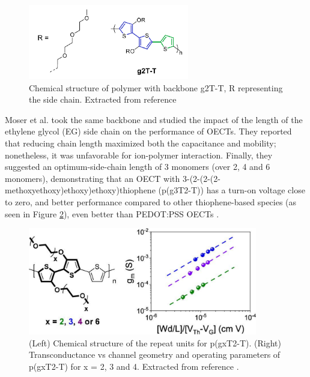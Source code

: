 \begin{figure}[h]
	\centering
	\includegraphics[width=7cm]{Images/pdf/g2T-T.pdf}
	\caption[Chemical structure of polymer g2T-T]{Chemical structure of polymer with backbone g2T-T, R representing the side chain. Extracted from reference \cite{nielsenMolecularDesignSemiconducting2016}}
	\label{fig:g2TT}
\end{figure}

Moser et al. took the same backbone and studied the impact of the length of the ethylene glycol (EG) side chain on the performance of OECTs. They reported that reducing chain length maximized both the capacitance and mobility; nonetheless, it was unfavorable for ion-polymer interaction. Finally, they suggested an optimum-side-chain length of 3 monomers (over 2, 4 and 6 monomers), demonstrating that an OECT with 3-(2-(2-(2-methoxyethoxy)ethoxy)ethoxy)thiophene (p(g3T2-T)) has a turn-on voltage close to zero, and better performance compared to other thiophene-based species (as seen in Figure \ref{fig:pg3t}), even better than PEDOT:PSS OECTs %
\cite{moserEthyleneGlycolBasedSide2020}.

\begin{figure}[h]
	\centering
	\includegraphics[width=10cm]{Images/pdf/pg3t+perf.pdf}
	\caption[Chemical structure and transconductance of g2T-T with side-chain engineering]{(Left) Chemical structure of the repeat units for p(gxT2-T). (Right) Transconductance vs channel geometry and operating parameters of p(gxT2-T) for x = 2, 3 and 4. Extracted from reference \cite{moserEthyleneGlycolBasedSide2020}.}
	\label{fig:pg3t}
\end{figure}

